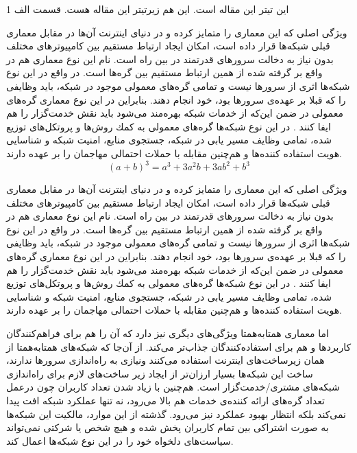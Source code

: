\documentclass[12pt,twoside]{xepersian-magazine}
\begin{document}
\begin{article}{1}
	{این تیتر این مقاله است.}
	{این هم زیرتیتر این مقاله هست.}
	{قسمت الف}
	{1}



		
\noindent{}
ويژگی اصلی که اين معماری را متمايز کرده و در دنيای اينترنت آن‌ها در مقابل معماری قبلی شبكه‌ها قرار داده است، امكان ايجاد ارتباط مستقيم  بين كامپيوترهای مختلف بدون نياز به دخالت سرورهای قدرتمند در بين راه است.  نام‌ اين نوع معماری هم در واقع بر گرفته شده از همین  ارتباط مستقیم بين گره‌ها است.  در واقع در اين نوع شبكه‌ها اثری از سرورها نيست و تمامی گره‌های معمولی موجود در شبكه، بايد وظايفی را که قبلا بر عهده‌ی سرورها بود، خود انجام دهند. بنابراين در اين نوع معماری گره‌های معمولی در ضمن اين‌که از خدمات شبکه بهره‌مند می‌شود بايد نقش خدمت‌گزار را هم ايفا کنند . در اين نوع شبکه‌ها گره‌های معمولی به كمك روش‌ها و پروتكل‌های توزيع شده، تمامی وظايف  مسير يابی در شبكه، جستجوی منابع، امنيت شبكه و شناسايی هويت استفاده كننده‌ها و هم‌چنين مقابله با حملات احتمالی مهاجمان را بر عهده دارند.
\begin{equation}
(a+b)^3=a^3+3a^2b+3ab^2+b^3
\end{equation}


ويژگی اصلی که اين معماری را متمايز کرده و در دنيای اينترنت آن‌ها در مقابل معماری قبلی شبكه‌ها قرار داده است، امكان ايجاد ارتباط مستقيم  بين كامپيوترهای مختلف بدون نياز به دخالت سرورهای قدرتمند در بين راه است.  نام‌ اين نوع معماری هم در واقع بر گرفته شده از همین  ارتباط مستقیم بين گره‌ها است.  در واقع در اين نوع شبكه‌ها اثری از سرورها نيست و تمامی گره‌های معمولی موجود در شبكه، بايد وظايفی را که قبلا بر عهده‌ی سرورها بود، خود انجام دهند. بنابراين در اين نوع معماری گره‌های معمولی در ضمن اين‌که از خدمات شبکه بهره‌مند می‌شود بايد نقش خدمت‌گزار را هم ايفا کنند . در اين نوع شبکه‌ها گره‌های معمولی به كمك روش‌ها و پروتكل‌های توزيع شده، تمامی وظايف  مسير يابی در شبكه، جستجوی منابع، امنيت شبكه و شناسايی هويت استفاده كننده‌ها و هم‌چنين مقابله با حملات احتمالی مهاجمان را بر عهده دارند.

اما معماری همتابه‌همتا ويژگی‌های ديگری نيز دارد که آن را هم برای فراهم‌کنندگان کاربردها و هم برای استفاده‌کنندگان جذاب‌تر می‌کند.  از آن‌جا که شبکه‌های همتابه‌همتا از همان زيرساخت‌های اينترنت استفاده می‌کنند ونيازی به راه‌اندازی سرورها ندارند، ساخت اين شبكه‌ها بسيار ارزان‌تر از ايجاد زير ساخت‌های لازم برای راه‌اندازی شبكه‌های مشتری/خدمت‌گزار است.  هم‌چنين با زياد شدن تعداد کاربران چون درعمل تعداد گره‌های ارائه کننده‌ی خدمات هم بالا می‌رود، نه تنها عملكرد شبكه افت پيدا نمی‌كند بلكه انتظار بهبود عملکرد نيز می‌رود. گذشته از اين موارد، مالكيت اين شبكه‌ها به صورت اشتراكی بين تمام کاربران پخش شده و هيچ شخص يا شركتی نمی‌تواند سياست‌های دلخواه خود را در اين نوع شبكه‌ها اعمال کند.


\end{article}
\end{document}
